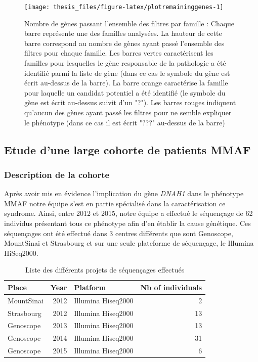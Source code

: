 \documentclass[12pt,twoside]{reedthesis}
\theoremstyle{definition}
\theoremstyle{definition}
\theoremstyle{remark}
\begin{document}
  \begin{figure}
  
  {\centering \texttt{[image: thesis\_files/figure-latex/plotremaininggenes-1]} 
  
  }
  
  \caption[Nombre de gènes passant l'ensemble des filtres par famille]{Nombre de gènes passant l'ensemble des filtres par famille  :  Chaque barre représente une des familles analysées. La hauteur de cette barre correspond au nombre de gènes ayant passé l'ensemble des filtres pour chaque famille. Les barres vertes caractérisent les familles pour lesquelles le gène responsable de la pathologie a été identifié parmi la liste de gène (dans ce cas le symbole du gène est écrit au-dessus de la barre). La barre orange caractérise la famille pour laquelle un candidat potentiel a été identifié (le symbole du gène est écrit au-dessus suivit d'un "?"). Les barres rouges indiquent qu'aucun des gènes ayant passé les filtres pour ne semble expliquer le phénotype (dans ce cas il est écrit "???" au-dessus de la barre)}\label{fig:plotremaininggenes}
  \end{figure}
  
  \newpage
  
  \subsection{Etude d'une large cohorte de patients
  MMAF}\label{cohortemmah}
  
  \subsubsection{Description de la
  cohorte}\label{description-de-la-cohorte}
  
  Après avoir mis en évidence l'implication du gène \emph{DNAH1} dans le
  phénotype MMAF notre équipe s'est en partie spécialisé dans la
  caractérisation ce syndrome. Ainsi, entre 2012 et 2015, notre équipe a
  effectué le séquençage de 62 individus présentant tous ce phénotype afin
  d'en établir la cause génétique. Ces séquençages ont été effectué dans 3
  centres différents que sont Genoscope, MountSinai et Strasbourg et sur
  une seule plateforme de séquençage, le Illumina HiSeq2000.
  
  \begin{longtable}[t]{lrlr}
  \caption{\label{tab:tabcohort}Liste des différents projets de séquençages effectués}\\
  \toprule
  Place & Year & Platform & Nb of individuals\\
  \midrule
  MountSinai & 2012 & Illumina Hiseq2000 & 2\\
  Strasbourg & 2012 & Illumina Hiseq2000 & 13\\
  Genoscope & 2013 & Illumina Hiseq2000 & 13\\
  Genoscope & 2014 & Illumina Hiseq2000 & 31\\
  Genoscope & 2015 & Illumina Hiseq2000 & 6\\
  \bottomrule
  \end{longtable}
  
\end{document}
